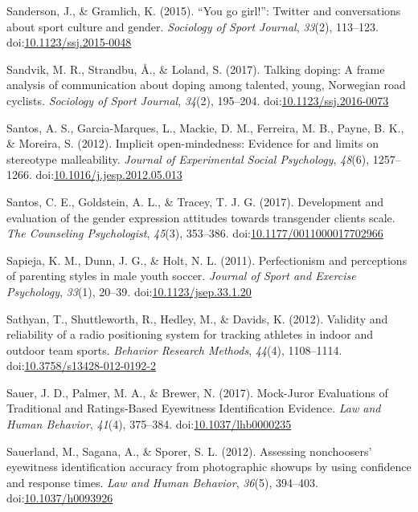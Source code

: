 \documentclass[english,man]{apa6}
\theoremstyle{definition}
\theoremstyle{definition}
\theoremstyle{definition}
\theoremstyle{remark}
\begin{document}
\hypertarget{ref-Sanderson2015}{}
Sanderson, J., \& Gramlich, K. (2015). ``You go girl!'': Twitter and
conversations about sport culture and gender. \emph{Sociology of Sport
Journal}, \emph{33}(2), 113--123.
doi:\href{https://doi.org/10.1123/ssj.2015-0048}{10.1123/ssj.2015-0048}

\hypertarget{ref-Sandvik2017}{}
Sandvik, M. R., Strandbu, Å., \& Loland, S. (2017). Talking doping: A
frame analysis of communication about doping among talented, young,
Norwegian road cyclists. \emph{Sociology of Sport Journal},
\emph{34}(2), 195--204.
doi:\href{https://doi.org/10.1123/ssj.2016-0073}{10.1123/ssj.2016-0073}

\hypertarget{ref-Santos2012}{}
Santos, A. S., Garcia-Marques, L., Mackie, D. M., Ferreira, M. B.,
Payne, B. K., \& Moreira, S. (2012). Implicit open-mindedness: Evidence
for and limits on stereotype malleability. \emph{Journal of Experimental
Social Psychology}, \emph{48}(6), 1257--1266.
doi:\href{https://doi.org/10.1016/j.jesp.2012.05.013}{10.1016/j.jesp.2012.05.013}

\hypertarget{ref-Santos2017}{}
Santos, C. E., Goldstein, A. L., \& Tracey, T. J. G. (2017). Development
and evaluation of the gender expression attitudes towards transgender
clients scale. \emph{The Counseling Psychologist}, \emph{45}(3),
353--386.
doi:\href{https://doi.org/10.1177/0011000017702966}{10.1177/0011000017702966}

\hypertarget{ref-Sapieja2011}{}
Sapieja, K. M., Dunn, J. G., \& Holt, N. L. (2011). Perfectionism and
perceptions of parenting styles in male youth soccer. \emph{Journal of
Sport and Exercise Psychology}, \emph{33}(1), 20--39.
doi:\href{https://doi.org/10.1123/jsep.33.1.20}{10.1123/jsep.33.1.20}

\hypertarget{ref-Sathyan2012}{}
Sathyan, T., Shuttleworth, R., Hedley, M., \& Davids, K. (2012).
Validity and reliability of a radio positioning system for tracking
athletes in indoor and outdoor team sports. \emph{Behavior Research
Methods}, \emph{44}(4), 1108--1114.
doi:\href{https://doi.org/10.3758/s13428-012-0192-2}{10.3758/s13428-012-0192-2}

\hypertarget{ref-Sauer2017}{}
Sauer, J. D., Palmer, M. A., \& Brewer, N. (2017). Mock-Juror
Evaluations of Traditional and Ratings-Based Eyewitness Identification
Evidence. \emph{Law and Human Behavior}, \emph{41}(4), 375--384.
doi:\href{https://doi.org/10.1037/lhb0000235}{10.1037/lhb0000235}

\hypertarget{ref-Sauerland2012}{}
Sauerland, M., Sagana, A., \& Sporer, S. L. (2012). Assessing
nonchoosers' eyewitness identification accuracy from photographic
showups by using confidence and response times. \emph{Law and Human
Behavior}, \emph{36}(5), 394--403.
doi:\href{https://doi.org/10.1037/h0093926}{10.1037/h0093926}
\end{document}
